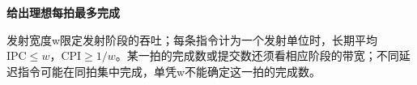 {\color{ink}\bfseries 给出理想每拍最多完成}\par\vspace{1bp}发射宽度w限定发射阶段的吞吐；每条指令计为一个发射单位时，长期平均\(\mathrm{IPC}\le w\)，\(\mathrm{CPI}\ge 1/\allowbreak{}w\)。某一拍的完成数或提交数还须看相应阶段的带宽；不同延迟指令可能在同拍集中完成，单凭w不能确定这一拍的完成数。
